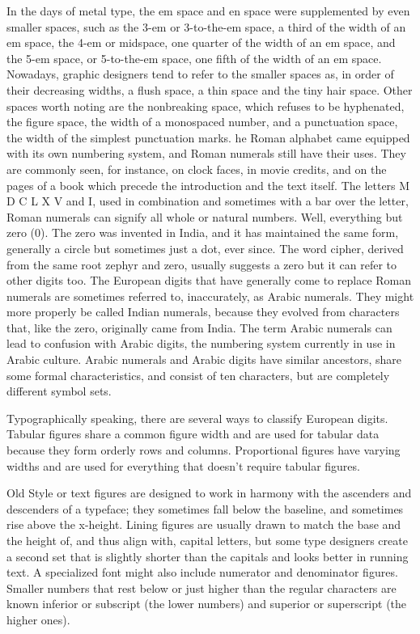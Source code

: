 \documentclass[12pt,a4paper,twocolumn]{book} %
\begin{document}
In the days of metal type, the em space and en space were supplemented by even smaller spaces, such as the 3-em or 3-to-the-em space, a third of the width of an em space, the 4-em or midspace, one quarter of the width of an em space, and the 5-em space, or 5-to-the-em space, one fifth of the width of an em space. Nowadays, graphic designers tend to refer to the smaller spaces as, in order of their decreasing widths, a flush space, a thin space and the tiny hair space. Other spaces worth noting are the nonbreaking space, which refuses to be hyphenated, the figure space, the width of a monospaced number, and a punctuation space, the width of the simplest punctuation marks.
he Roman alphabet came equipped with its own numbering system, and Roman numerals still have their uses. They are commonly seen, for instance, on clock faces, in movie credits, and on the pages of a book which precede the introduction and the text itself. The letters M D C L X V and I, used in combination and sometimes with a bar over the letter, Roman numerals can signify all whole or natural numbers. Well, everything but zero (0). The zero was invented in India, and it has maintained the same form, generally a circle but sometimes just a dot, ever since.
The word cipher, derived from the same root zephyr and zero, usually suggests a zero but it can refer to other digits too. The European digits that have generally come to replace Roman numerals are sometimes referred to, inaccurately, as Arabic numerals. They might more properly be called Indian numerals, because they evolved from characters that, like the zero, originally came from India. The term Arabic numerals can lead to confusion with Arabic digits, the numbering system currently in use in Arabic culture. Arabic numerals and Arabic digits have similar ancestors, share some formal characteristics, and consist of ten characters, but are completely different symbol sets.

Typographically speaking, there are several ways to classify European digits. Tabular figures share a common figure width and are used for tabular data because they form orderly rows and columns. Proportional figures have varying widths and are used for everything that doesn’t require tabular figures.

Old Style or text figures are designed to work in harmony with the ascenders and descenders of a typeface; they sometimes fall below the baseline, and sometimes rise above the x-height. Lining figures are usually drawn to match the base and the height of, and thus align with, capital letters, but some type designers create a second set that is slightly shorter than the capitals and looks better in running text.
A specialized font might also include numerator and denominator figures. Smaller numbers that rest below or just higher than the regular characters are known inferior or subscript (the lower numbers) and superior or superscript (the higher ones).
\end{document}
